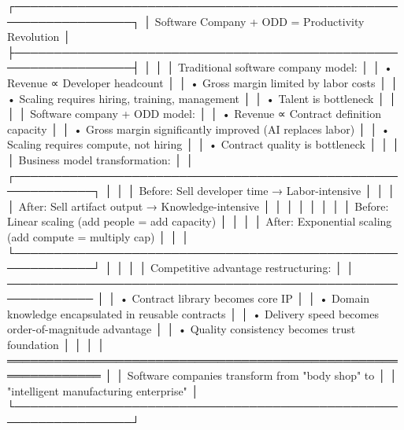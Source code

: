 \documentclass[
]{article}
\newenvironment{Shaded}{}{}
\newcommand{\NormalTok}[1]{#1}
\begin{document}
\begin{Shaded}
\begin{Highlighting}[]
\NormalTok{┌─────────────────────────────────────────────────────────────────┐}
\NormalTok{│        Software Company + ODD = Productivity Revolution          │}
\NormalTok{├─────────────────────────────────────────────────────────────────┤}
\NormalTok{│                                                                  │}
\NormalTok{│  Traditional software company model:                            │}
\NormalTok{│  • Revenue ∝ Developer headcount                                │}
\NormalTok{│  • Gross margin limited by labor costs                          │}
\NormalTok{│  • Scaling requires hiring, training, management                │}
\NormalTok{│  • Talent is bottleneck                                         │}
\NormalTok{│                                                                  │}
\NormalTok{│  Software company + ODD model:                                  │}
\NormalTok{│  • Revenue ∝ Contract definition capacity                       │}
\NormalTok{│  • Gross margin significantly improved (AI replaces labor)      │}
\NormalTok{│  • Scaling requires compute, not hiring                         │}
\NormalTok{│  • Contract quality is bottleneck                               │}
\NormalTok{│                                                                  │}
\NormalTok{│  Business model transformation:                                 │}
\NormalTok{│  ┌────────────────────────────────────────────────────────────┐ │}
\NormalTok{│  │  Before: Sell developer time → Labor{-}intensive             │ │}
\NormalTok{│  │  After:  Sell artifact output → Knowledge{-}intensive        │ │}
\NormalTok{│  │                                                            │ │}
\NormalTok{│  │  Before: Linear scaling (add people = add capacity)        │ │}
\NormalTok{│  │  After:  Exponential scaling (add compute = multiply cap)  │ │}
\NormalTok{│  └────────────────────────────────────────────────────────────┘ │}
\NormalTok{│                                                                  │}
\NormalTok{│  Competitive advantage restructuring:                           │}
\NormalTok{│  ─────────────────────────────────────────────────────────────  │}
\NormalTok{│  • Contract library becomes core IP                             │}
\NormalTok{│  • Domain knowledge encapsulated in reusable contracts          │}
\NormalTok{│  • Delivery speed becomes order{-}of{-}magnitude advantage          │}
\NormalTok{│  • Quality consistency becomes trust foundation                 │}
\NormalTok{│                                                                  │}
\NormalTok{│  ══════════════════════════════════════════════════════════════  │}
\NormalTok{│  Software companies transform from "body shop" to               │}
\NormalTok{│  "intelligent manufacturing enterprise"                         │}
\NormalTok{└─────────────────────────────────────────────────────────────────┘}
\end{Highlighting}
\end{Shaded}
\end{document}
